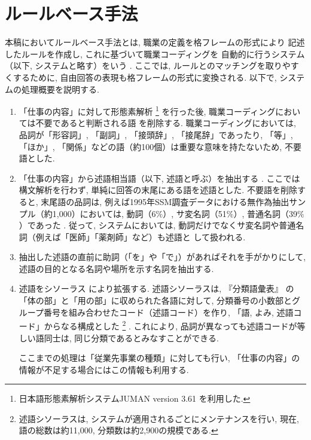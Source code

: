 \documentclass{nlp}
\begin{document}
\section{ルールベース手法}
\label{rule}
本稿においてルールベース手法とは, 
職業の定義を格フレームの形式により
記述したルールを作成し, これに基づいて職業コーディングを
自動的に行うシステム（以下, システムと略す）をいう
\cite{Takahashi00}
. 
ここでは, ルールとのマッチングを取りやすくするために, 
自由回答の表現も格フレームの形式に変換される. 
以下で, システムの処理概要を説明する. 
\begin{enumerate}
\item 「仕事の内容」に対して形態素解析
\footnote{日本語形態素解析システムJUMAN version 3.61 
\cite{Kurohashi98}
を利用した. }
を行った後, 
職業コーディングにおいては不要であると判断される語
を削除する. 
職業コーディングにおいては, 
品詞が「形容詞」, 「副詞」, 「接頭辞」, 「接尾辞」であったり, 
「等」, 「ほか」, 「関係」などの語（約100個）は重要な意味を持たないため, 
不要語とした. 
\item 「仕事の内容」から述語相当語（以下, 述語と呼ぶ）を抽出する
. 
ここでは構文解析を行わず, 
単純に回答の末尾にある語を述語とした. 
不要語を削除すると, 末尾語の品詞は, 
例えば1995年SSM調査データにおける無作為抽出サンプル（約1,000）においては, 
動詞（6$\%$）, サ変名詞（51$\%$）, 普通名詞（39$\%$）であった
\cite{Takahashi00}
. 
従って, システムにおいては, 
動詞だけでなくサ変名詞や普通名詞（例えば「医師」「薬剤師」など）も述語と
して扱われる. 
\item 抽出した述語の直前に助詞（「を」や「で」）があればそれを手がかりにして, 
述語の目的となる名詞や場所を示す名詞を抽出する. 
\item 述語をシソーラス
により拡張する. 
述語シソーラスは, 
『分類語彙表』
\cite{bunrui64}
の「体の部」と「用の部」に収められた各語に対して, 
分類番号の小数部とグループ番号を組み合わせたコード（述語コード）を作り, 
「語, よみ, 述語コード」からなる構成とした
\footnote{述語シソーラスは, 
システムが適用されるごとにメンテナンスを行い, 
現在, 語の総数は約11,000, 分類数は約2,900の規模である. }
. 
これにより, 品詞が異なっても述語コードが等しい語同士は, 
同じ分類であるとみなすことができる. 

ここまでの処理は「従業先事業の種類」に対しても行い, 
「仕事の内容」の情報が不足する場合にはこの情報も利用する. 


\end{enumerate}
\end{document}
